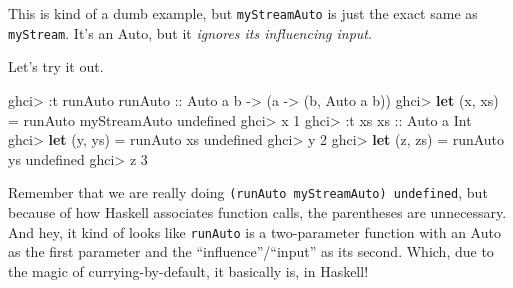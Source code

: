 \documentclass[]{article}
\newenvironment{Shaded}{}{}
\newcommand{\KeywordTok}[1]{\textcolor[rgb]{0.00,0.44,0.13}{\textbf{{#1}}}}
\newcommand{\DataTypeTok}[1]{\textcolor[rgb]{0.56,0.13,0.00}{{#1}}}
\newcommand{\DecValTok}[1]{\textcolor[rgb]{0.25,0.63,0.44}{{#1}}}
\newcommand{\CommentTok}[1]{\textcolor[rgb]{0.38,0.63,0.69}{\textit{{#1}}}}
\newcommand{\OtherTok}[1]{\textcolor[rgb]{0.00,0.44,0.13}{{#1}}}
\newcommand{\FunctionTok}[1]{\textcolor[rgb]{0.02,0.16,0.49}{{#1}}}
\newcommand{\NormalTok}[1]{{#1}}
\begin{document}
\begin{Shaded}
\end{Shaded}

This is kind of a dumb example, but \texttt{myStreamAuto} is just the
exact same as \texttt{myStream}. It's an Auto, but it \emph{ignores its
influencing input}.

Let's try it out.

\begin{Shaded}
\begin{Highlighting}[]
\NormalTok{ghci}\FunctionTok{>} \FunctionTok{:}\NormalTok{t runAuto}
\OtherTok{runAuto ::} \DataTypeTok{Auto} \NormalTok{a b }\OtherTok{->} \NormalTok{(a }\OtherTok{->} \NormalTok{(b, }\DataTypeTok{Auto} \NormalTok{a b))}
\NormalTok{ghci}\FunctionTok{>} \KeywordTok{let} \NormalTok{(x, xs) }\FunctionTok{=} \NormalTok{runAuto myStreamAuto undefined}
\NormalTok{ghci}\FunctionTok{>} \NormalTok{x}
\DecValTok{1}
\NormalTok{ghci}\FunctionTok{>} \FunctionTok{:}\NormalTok{t xs}
\OtherTok{xs ::} \DataTypeTok{Auto} \NormalTok{a }\DataTypeTok{Int}
\NormalTok{ghci}\FunctionTok{>} \KeywordTok{let} \NormalTok{(y, ys) }\FunctionTok{=} \NormalTok{runAuto xs undefined}
\NormalTok{ghci}\FunctionTok{>} \NormalTok{y}
\DecValTok{2}
\NormalTok{ghci}\FunctionTok{>} \KeywordTok{let} \NormalTok{(z, zs) }\FunctionTok{=} \NormalTok{runAuto ys undefined}
\NormalTok{ghci}\FunctionTok{>} \NormalTok{z}
\DecValTok{3}
\end{Highlighting}
\end{Shaded}

Remember that we are really doing
\texttt{(runAuto\ myStreamAuto)\ undefined}, but because of how Haskell
associates function calls, the parentheses are unnecessary. And hey, it
kind of looks like \texttt{runAuto} is a two-parameter function with an
Auto as the first parameter and the ``influence''/``input'' as its
second. Which, due to the magic of currying-by-default, it basically is,
in Haskell!
\end{document}
